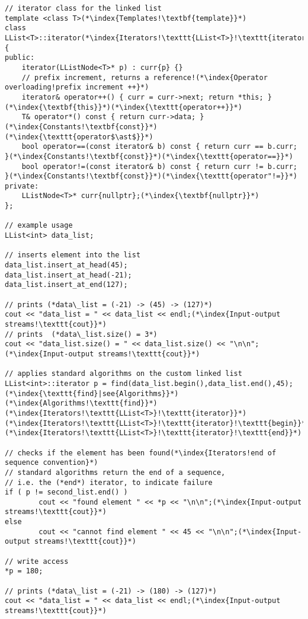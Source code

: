 \documentclass[10pt]{article}
\begin{document}
\begin{lstlisting}
// iterator class for the linked list
template <class T>(*\index{Templates!\textbf{template}}*)
class LList<T>::iterator(*\index{Iterators!\texttt{LList<T>}!\texttt{iterator}}*)
{
public:
    iterator(LListNode<T>* p) : curr{p} {}
    // prefix increment, returns a reference!(*\index{Operator overloading!prefix increment ++}*)
    iterator& operator++() { curr = curr->next; return *this; }(*\index{\textbf{this}}*)(*\index{\texttt{operator++}}*)
    T& operator*() const { return curr->data; }(*\index{Constants!\textbf{const}}*)(*\index{\texttt{operator$\ast$}}*)
    bool operator==(const iterator& b) const { return curr == b.curr; }(*\index{Constants!\textbf{const}}*)(*\index{\texttt{operator==}}*)
    bool operator!=(const iterator& b) const { return curr != b.curr; }(*\index{Constants!\textbf{const}}*)(*\index{\texttt{operator"!=}}*)
private:
    LListNode<T>* curr{nullptr};(*\index{\textbf{nullptr}}*)
};

// example usage
LList<int> data_list;

// inserts element into the list
data_list.insert_at_head(45);
data_list.insert_at_head(-21);
data_list.insert_at_end(127);

// prints (*data\_list = (-21) -> (45) -> (127)*)
cout << "data_list = " << data_list << endl;(*\index{Input-output streams!\texttt{cout}}*)
// prints  (*data\_list.size() = 3*)
cout << "data_list.size() = " << data_list.size() << "\n\n";(*\index{Input-output streams!\texttt{cout}}*)

// applies standard algorithms on the custom linked list
LList<int>::iterator p = find(data_list.begin(),data_list.end(),45);(*\index{\texttt{find}|see{Algorithms}}*)(*\index{Algorithms!\texttt{find}}*)(*\index{Iterators!\texttt{LList<T>}!\texttt{iterator}}*)(*\index{Iterators!\texttt{LList<T>}!\texttt{iterator}!\texttt{begin}}*)(*\index{Iterators!\texttt{LList<T>}!\texttt{iterator}!\texttt{end}}*)

// checks if the element has been found(*\index{Iterators!end of sequence convention}*)
// standard algorithms return the end of a sequence, 
// i.e. the (*end*) iterator, to indicate failure
if ( p != second_list.end() )
        cout << "found element " << *p << "\n\n";(*\index{Input-output streams!\texttt{cout}}*)
else
        cout << "cannot find element " << 45 << "\n\n";(*\index{Input-output streams!\texttt{cout}}*)

// write access
*p = 180;

// prints (*data\_list = (-21) -> (180) -> (127)*)
cout << "data_list = " << data_list << endl;(*\index{Input-output streams!\texttt{cout}}*)
\end{lstlisting}
%
%
\end{document}
